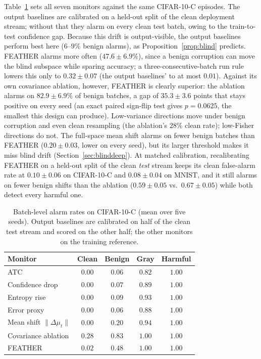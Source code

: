 \documentclass[conference]{IEEEtran}
\begin{document}
Table~\ref{tab:alarms} sets all seven monitors against the same CIFAR-10-C
episodes. The output baselines are calibrated on a held-out split of the clean
deployment stream; without that they alarm on every clean test batch, owing to
the train-to-test confidence gap. Because this drift is output-visible, the
output baselines perform best here ($6$--$9\%$ benign alarms), as
Proposition~\ref{prop:blind} predicts. FEATHER alarms more often
($47.6 \pm 6.9\%$), since a benign corruption can move the blind subspace while
sparing accuracy; a three-consecutive-batch run rule lowers this only to
$0.32 \pm 0.07$ (the output baselines' to at most $0.01$). Against its own
covariance ablation, however, FEATHER is clearly superior: the ablation alarms
on $82.9 \pm 6.9\%$ of benign batches, a gap of $35.3 \pm 3.6$ points that
stays positive on every seed (an exact paired sign-flip test gives
$p = 0.0625$, the smallest this design can produce). Low-variance directions
move under benign corruption and even clean resampling (the ablation's $28\%$
clean rate); low-Fisher directions do not. The full-space mean shift alarms on
fewer benign batches than FEATHER ($0.20 \pm 0.03$, lower on every seed), but
its larger threshold makes it miss blind drift (Section~\ref{sec:blinddeep}).
At matched calibration, recalibrating FEATHER on a held-out split of the clean
\emph{test} stream keeps its clean false-alarm rate at $0.10 \pm 0.06$ on
CIFAR-10-C and $0.08 \pm 0.04$ on MNIST, and it still alarms on fewer benign
shifts than the ablation ($0.59 \pm 0.05$ vs.\ $0.67 \pm 0.05$) while both
detect every harmful one.

\begin{table}[t]
\caption{Batch-level alarm rates on CIFAR-10-C (mean over five seeds). Output
baselines are calibrated on half of the clean test stream and scored on the
other half; the other monitors on the training reference.}
\label{tab:alarms}
\centering
\footnotesize
\begin{tabular}{lcccc}
\hline
Monitor & Clean & Benign & Gray & Harmful \\
\hline
ATC \cite{garg2022atc} & $0.00$ & $\mathbf{0.06}$ & $0.82$ & $1.00$ \\
Confidence drop & $0.00$ & $0.07$ & $0.89$ & $1.00$ \\
Entropy rise & $0.00$ & $0.09$ & $0.93$ & $1.00$ \\
Error proxy \cite{amoukou2024sequential} & $0.00$ & $\mathbf{0.06}$ & $0.88$ & $1.00$ \\
\hline
Mean shift $\lVert\Delta\mu_t\rVert$ & $0.00$ & $0.20$ & $0.94$ & $1.00$ \\
Covariance ablation & $0.28$ & $0.83$ & $1.00$ & $1.00$ \\
FEATHER & $0.02$ & $0.48$ & $1.00$ & $1.00$ \\
\hline
\end{tabular}
\end{table}
\end{document}
